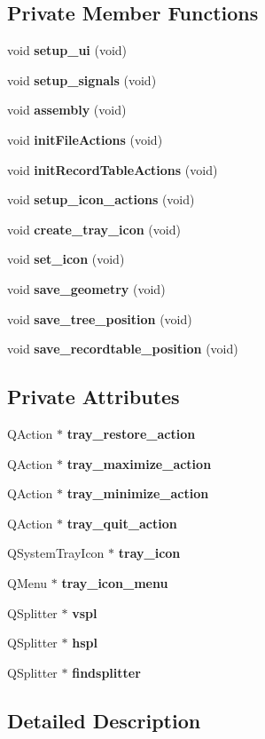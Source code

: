 \subsection*{Private Member Functions}
\begin{CompactItemize}
\item 
void {\bf setup\_\-ui} (void)
\item 
void {\bf setup\_\-signals} (void)
\item 
void {\bf assembly} (void)
\item 
void {\bf init\-File\-Actions} (void)
\item 
void {\bf init\-Record\-Table\-Actions} (void)
\item 
void {\bf setup\_\-icon\_\-actions} (void)
\item 
void {\bf create\_\-tray\_\-icon} (void)
\item 
void {\bf set\_\-icon} (void)
\item 
void {\bf save\_\-geometry} (void)
\item 
void {\bf save\_\-tree\_\-position} (void)
\item 
void {\bf save\_\-recordtable\_\-position} (void)
\end{CompactItemize}
\subsection*{Private Attributes}
\begin{CompactItemize}
\item 
QAction $\ast$ {\bf tray\_\-restore\_\-action}
\item 
QAction $\ast$ {\bf tray\_\-maximize\_\-action}
\item 
QAction $\ast$ {\bf tray\_\-minimize\_\-action}
\item 
QAction $\ast$ {\bf tray\_\-quit\_\-action}
\item 
QSystem\-Tray\-Icon $\ast$ {\bf tray\_\-icon}
\item 
QMenu $\ast$ {\bf tray\_\-icon\_\-menu}
\item 
QSplitter $\ast$ {\bf vspl}
\item 
QSplitter $\ast$ {\bf hspl}
\item 
QSplitter $\ast$ {\bf findsplitter}
\end{CompactItemize}


\subsection{Detailed Description}




